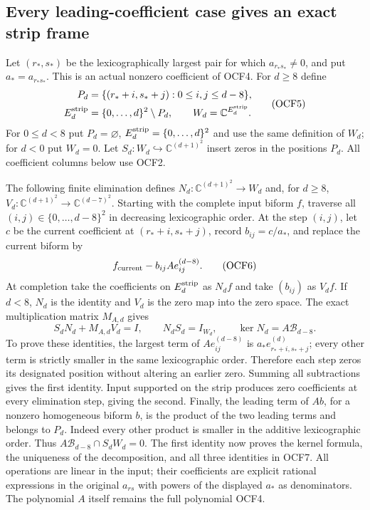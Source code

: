 \subsection{Every leading-coefficient case gives an exact strip frame}

Let $(r_*,s_*)$ be the lexicographically largest pair for which
$a_{r_*s_*}\ne0$, and put $a_*=a_{r_*s_*}$. This is an
actual nonzero coefficient of OCF4. For $d\geq8$ define
\[
 \begin{split}
 P_d&=\{(r_*+i,s_*+j):0\leq i,j\leq d-8\},\\
 E_d^{\rm strip}&=\{0,\ldots,d\}^2\setminus P_d,\qquad
 W_d=\mathbb C^{E_d^{\rm strip}}.
 \end{split}\tag{OCF5}
\]
For $0\leq d<8$ put $P_d=\varnothing$,
$E_d^{\rm strip}=\{0,\ldots,d\}^2$ and use the same definition
of $W_d$; for $d<0$ put $W_d=0$. Let
$S_d:W_d\hookrightarrow\mathbb C^{(d+1)^2}$ insert zeros in
the positions $P_d$. All coefficient columns below use OCF2.

The following finite elimination defines
$N_d:\mathbb C^{(d+1)^2}\to W_d$ and, for $d\geq8$,
$V_d:\mathbb C^{(d+1)^2}\to\mathbb C^{(d-7)^2}$.
Starting with the complete input biform $f$, traverse all
$(i,j)\in\{0,\ldots,d-8\}^2$ in decreasing lexicographic order.
At the step $(i,j)$, let $c$ be the current coefficient at
$(r_*+i,s_*+j)$, record $b_{ij}=c/a_*$, and replace the current
biform by
\[
       f_{\rm current}-b_{ij}A e_{ij}^{(d-8)}.
 \tag{OCF6}
\]
At completion take the coefficients on $E_d^{\rm strip}$ as
$N_df$ and take $(b_{ij})$ as $V_df$. If $d<8$, $N_d$ is the
identity and $V_d$ is the zero map into the zero space.
The exact multiplication matrix $M_{A,d}$ gives
\[
 S_dN_d+M_{A,d}V_d=I,\qquad
 N_dS_d=I_{W_d},\qquad
 \ker N_d=A\mathcal B_{d-8}.
 \tag{OCF7}
\]
To prove these identities, the largest term of
$A e_{ij}^{(d-8)}$ is $a_*e_{r_*+i,s_*+j}^{(d)}$;
every other term is strictly smaller in the same lexicographic
order. Therefore each step zeros its designated position without
altering an earlier zero. Summing all subtractions gives the
first identity. Input supported on the strip produces zero
coefficients at every elimination step, giving the second.
Finally, the leading term of $Ab$, for a nonzero homogeneous
biform $b$, is the product of the two leading terms and belongs
to $P_d$. Indeed every other product is smaller in the additive
lexicographic order. Thus
$A\mathcal B_{d-8}\cap S_dW_d=0$. The first identity now proves
the kernel formula, the uniqueness of the decomposition, and all
three identities in OCF7. All operations are linear in the input;
their coefficients are explicit rational expressions in the
original $a_{rs}$ with powers of the displayed $a_*$ as denominators.
The polynomial $A$ itself remains the full polynomial OCF4.

